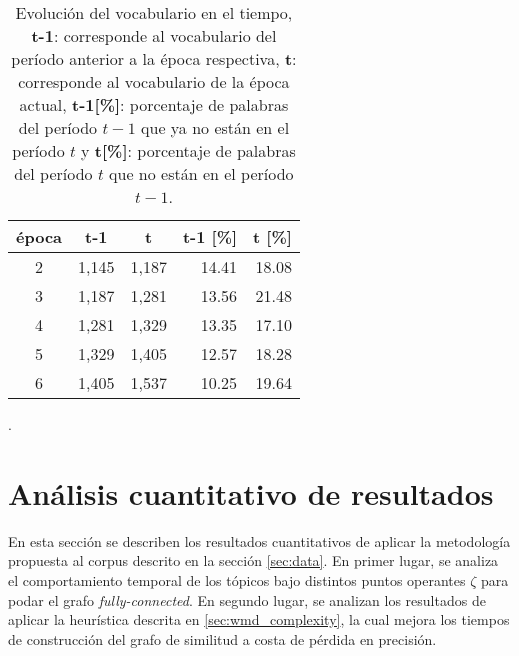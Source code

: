 \begin{table}[H]
    \begin{tabular}{|c|r|r|r|r|}
    \hline
    \textbf{época} & \multicolumn{1}{c|}{\textbf{t-1}} & \multicolumn{1}{c|}{\textbf{t}} & \multicolumn{1}{c|}{\textbf{t-1 {[}\%{]}}} & \multicolumn{1}{l|}{\textbf{t {[}\%{]}}} \\ \hline
    2              & 1,145                              & 1,187                            & 14.41                                      & 18.08                                    \\ \hline
    3              & 1,187                              & 1,281                            & 13.56                                      & 21.48                                    \\ \hline
    4              & 1,281                              & 1,329                            & 13.35                                      & 17.10                                    \\ \hline
    5              & 1,329                              & 1,405                            & 12.57                                      & 18.28                                    \\ \hline
    6              & 1,405                              & 1,537                            & 10.25                                      & 19.64                                    \\ \hline
    \end{tabular}
    \caption{Evolución del vocabulario en el tiempo, \textbf{t-1}: corresponde al vocabulario del período anterior a la época respectiva, \textbf{t}: corresponde al vocabulario de la época actual, \textbf{t-1[\%]}: porcentaje de palabras del período $t-1$ que ya no están en el período $t$ y \textbf{t[\%]}: porcentaje de palabras del período $t$ que no están en el período $t-1$.}
    \label{table:innovation_rate}.
\end{table}

\section{Análisis cuantitativo de resultados}
\label{sec:quantative}

En esta sección se describen los resultados cuantitativos de aplicar la metodología propuesta al corpus descrito en la sección \ref{sec:data}. En primer lugar, se analiza el comportamiento temporal de los tópicos bajo distintos puntos operantes $\zeta$ para podar el grafo \textit{fully-connected}. En segundo lugar, se analizan los resultados de aplicar la heurística descrita en \ref{sec:wmd_complexity}, la cual mejora los tiempos de construcción del grafo de similitud a costa de pérdida en precisión.

